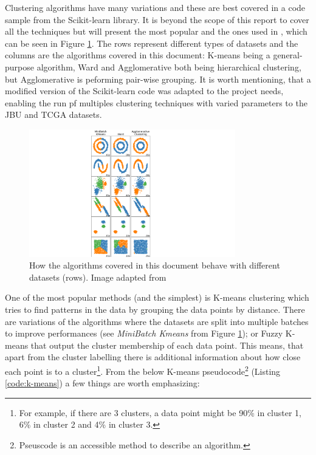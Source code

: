 Clustering algorithms have many variations and these are best covered in a code sample\cite{Scikit-learn_undated-ax} from the Scikit-learn library\cite{Pedregosa2011-ts}. It is beyond the scope of this report to cover all the techniques but will present the most popular and the ones used in , which can be seen in Figure \ref{fig:clustering_types}. The rows represent different types of datasets and the columns are the algorithms covered in this document: K-means being a general-purpose algorithm, Ward and Agglomerative both being hierarchical clustering, but Agglomerative is peforming pair-wise grouping. It is worth mentioning, that a modified version of the Scikit-learn code was adapted to the project needs, enabling the run pf multiples clustering techniques with varied parameters to the JBU and TCGA datasets. 

\begin{figure}[!htb]
  \centering\includegraphics[width=0.8\textwidth,height=0.5\textheight,keepaspectratio]{Images/Clustering/scikit_selected.png}
    \caption{How the algorithms covered in this document behave with different datasets (rows). Image adapted from \cite{Scikit-learn_undated-ax}}
    \label{fig:clustering_types}
\end{figure}
\FloatBarrier

One of the most popular methods (and the simplest) is K-means clustering which tries to find patterns in the data by grouping the data points by distance. There are variations of the algorithms where the datasets are split into multiple batches to improve performances (see \textit{MiniBatch Kmeans} from Figure \ref{fig:clustering_types}); or Fuzzy K-means that output the cluster membership of each data point. This means, that apart from the cluster labelling there is additional information about how close each point is to a cluster\footnote{For example, if there are 3 clusters, a data point might be 90\% in cluster 1, 6\% in cluster 2 and 4\% in cluster 3.}. From the below K-means pseudocode\footnote{Pseuscode is an accessible method to describe an algorithm.} (Listing \ref{code:k-means}) a few things are worth emphasizing:

